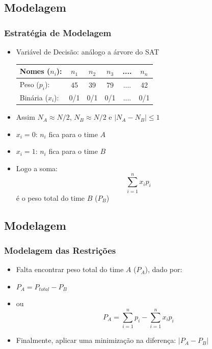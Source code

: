 \documentclass{beamer}
\begin{document}
\subsection{Modelagem}

\begin{frame}
\frametitle{Estratégia de Modelagem}
\begin{block}{}
  \begin{itemize}
  \item Variável de Decisão: análogo a árvore do SAT  
 
\begin{center}
\begin{tabular}{|l|c|c|c|c|c|}
\hline
Nomes ($n_i$): & $n_1$ & $n_2$ & $n_3$ & .... & $n_n$ \\ \hline
Peso ($p_i$): & 45 & 39 & 79 & .... & 42  \\ \hline
Binária ($x_i$): & 0/1 & 0/1 & 0/1 & .... & 0/1  \\ \hline
\end{tabular}
\end{center}
  
\item Assim $N_A \approx N/2$, $N_B \approx N/2$  e  $|N_A - N_B| \le 1$   

\item $x_i = 0$: $n_i$ fica para o time $A$
\item $x_i = 1$: $n_i$ fica para o time $B$
\item Logo a soma:
$$\sum_{i=1}^n x_i p_i$$ é o peso total do time $B$ ($P_B$)
  
  \end{itemize}
\end{block}
\end{frame}

\subsection{Modelagem}

\begin{frame}
\frametitle{Modelagem das Restrições}
\begin{block}{}
  \begin{itemize}
  \item Falta encontrar peso total do time $A$ ($P_A$), dado por: 

  \item $P_A = P_{total} - P_B$
  
  \item  ou $$P_A = \sum_{i=1}^n p_i - \sum_{i=1}^n x_i p_i$$   

  \item Finalmente, aplicar uma minimização  na diferença: $|P_A - P_B|$
  
  
  \end{itemize}
\end{block}
\end{frame}
\end{document}
